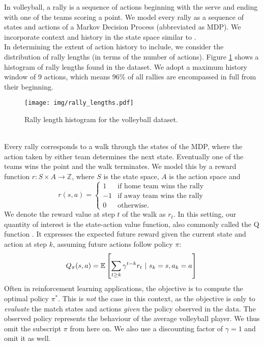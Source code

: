 \documentclass{sfuthesis}
\begin{document}
	In volleyball, a rally is a sequence of actions beginning with the serve and ending with one of the teams scoring a point. We model every rally as a sequence of states and actions of a Markov Decision Process (abbreviated as MDP). We incorporate context and history in the state space similar to \cite{schulte2017markov}.\\
	In determining the extent of action history to include, we consider the distribution of rally lengths (in terms of the number of actions). Figure \ref{fig:rally-lengths} shows a histogram of rally lengths found in the dataset. We adopt a maximum history window of 9 actions, which means 96\% of all rallies are encompassed in full from their beginning.\\
	\begin{figure}
		\texttt{[image: img/rally\_lengths.pdf]}
		\caption{Rally length histogram for the volleyball dataset.}
		\label{fig:rally-lengths}
	\end{figure}
	\\
	Every rally corresponds to a walk through the states of the MDP, where the action taken by either team determines the next state. Eventually one of the teams wins the point and the walk terminates. We model this by a reward function $r: S \times A \rightarrow \mathbb{Z}$, where $S$ is the state space, $A$ is the action space and
	\begin{equation}
		r(s,a) =
		\begin{cases} 
			1 & \text{if home team wins the rally} \\
			-1 & \text{if away team wins the rally} \\
			0 & \text{otherwise.} 
		\end{cases}
		\label{eq:reward_function}
	\end{equation}
	We denote the reward value at step $t$ of the walk as $r_t$. In this setting, our quantity of interest is the state-action value function, also commonly called the Q function \cite{sutton2018reinforcement}. It expresses the expected future reward given the current state and action at step $k$, assuming future actions follow policy $\pi$:
	\begin{equation}
		Q_\pi(s,a) = \mathbb{E} \left[ \sum_{t \ge k} \gamma^{t-k} r_{t} \ | \ s_k = s, a_k = a \right]\\
		\label{eq:qfunction}
	\end{equation}
	Often in reinforcement learning applications, the objective is to compute the optimal policy $\pi^*$. This is {\em not} the case in this context, as the objective is only to {\em evaluate} the match states and actions {\em given} the policy observed in the data. The observed policy represents the behaviour of the average volleyball player. We  thus omit the subscript $\pi$ from here on. We also use a discounting factor of $\gamma=1$ and omit it as well. 
	
\end{document}
